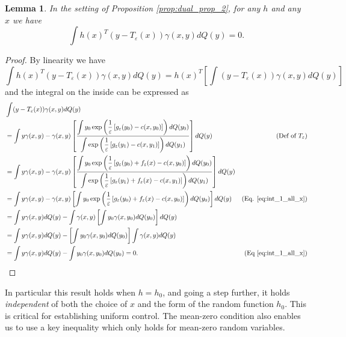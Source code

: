 \documentclass{article}
\newtheorem{lemma}{Lemma}
\theoremstyle{definition}
\newcommand{\feps}{f_\varepsilon}
\newcommand{\geps}{g_\varepsilon}
\newcommand{\Teps}{T_\varepsilon}
\begin{document}
\begin{lemma} \label{lem:h_int_0}
    In the setting of Proposition \ref{prop:dual_prop_2}, for any $h$ and any $x$ we have
    \begin{equation*}
        \int h(x)^T(y - \Teps(x))\gamma(x,y)dQ(y) = 0.%
    \end{equation*}
\end{lemma} 

\begin{proof}
By linearity we have
\begin{equation*}
     \int h(x)^T(y - \Teps(x))\gamma(x,y)dQ(y) = h(x)^T \left [\int (y - \Teps(x))\gamma(x,y) dQ(y)\right ]
\end{equation*}
and the integral on the inside can be expressed as 
\begin{align*}
    &\int (y - \Teps(x))\gamma(x,y) dQ(y) \\
    &= \int y\gamma(x,y) - \gamma(x,y)\left [\frac{
            \displaystyle\int y_0 \exp\left (\frac{1}{\varepsilon}\left [\geps(y_0) - c(x,y_0) \right ] \right ) dQ(y_0)
        }{
            \displaystyle\int \exp\left (\frac{1}{\varepsilon}\left [\geps(y_1) - c(x,y_1) \right ] \right ) dQ(y_1)
        } \right ] dQ(y) &(\text{Def of } \Teps) \\
    &= \int y\gamma(x,y) - \gamma(x,y)\left [\frac{
            \displaystyle\int y_0 \exp\left (\frac{1}{\varepsilon}\left [\geps(y_0) + \feps(x) - c(x,y_0) \right ] \right ) dQ(y_0)
        }{
            \displaystyle\int \exp\left (\frac{1}{\varepsilon}\left [\geps(y_1) + \feps(x) - c(x,y_1) \right ] \right ) dQ(y_1)
        } \right ] dQ(y) \\
    &= \int y\gamma(x,y) - \gamma(x,y)\left [
            \int y_0 \exp\left (\frac{1}{\varepsilon}\left [\geps(y_0) + \feps(x) - c(x,y_0) \right ] \right ) dQ(y_0)
        \right ] dQ(y) & (\text{Eq. } \ref{eq:int_1_all_x}) \\
    &= \int y\gamma(x,y)dQ(y) - \int\gamma(x,y)\left [ \int y_0 \gamma(x,y_0) dQ(y_0)\right ]dQ(y) \\
    &= \int y\gamma(x,y)dQ(y) - \left [ \int y_0 \gamma(x,y_0) dQ(y_0)\right ]\int \gamma(x,y)dQ(y) \\
    &= \int y\gamma(x,y)dQ(y) -  \int y_0 \gamma (x,y_0) dQ(y_0) = 0. & (\text{Eq \ref{eq:int_1_all_x}})
\end{align*}
\end{proof}

In particular this result holds when $h = h_0$, and going a step further, it holds \textit{independent} of both the choice of $x$ and the form of the random function $h_0$. This is critical for establishing uniform control. The mean-zero condition also enables us to use a key inequality which only holds for mean-zero random variables.
\end{document}
